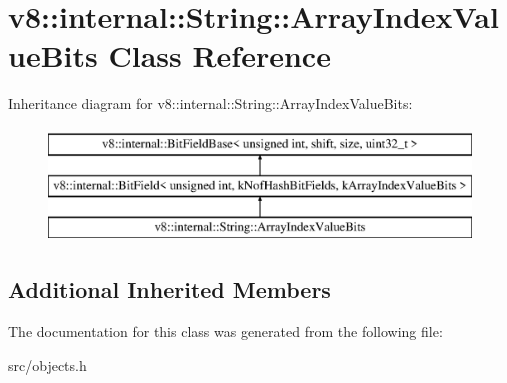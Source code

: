 \hypertarget{classv8_1_1internal_1_1_string_1_1_array_index_value_bits}{}\section{v8\+:\+:internal\+:\+:String\+:\+:Array\+Index\+Value\+Bits Class Reference}
\label{classv8_1_1internal_1_1_string_1_1_array_index_value_bits}
Inheritance diagram for v8\+:\+:internal\+:\+:String\+:\+:Array\+Index\+Value\+Bits\+:\begin{figure}[H]
\begin{center}
\leavevmode
\includegraphics[height=3.000000cm]{classv8_1_1internal_1_1_string_1_1_array_index_value_bits}
\end{center}
\end{figure}
\subsection*{Additional Inherited Members}


The documentation for this class was generated from the following file\+:\begin{DoxyCompactItemize}
\item 
src/objects.\+h\end{DoxyCompactItemize}
